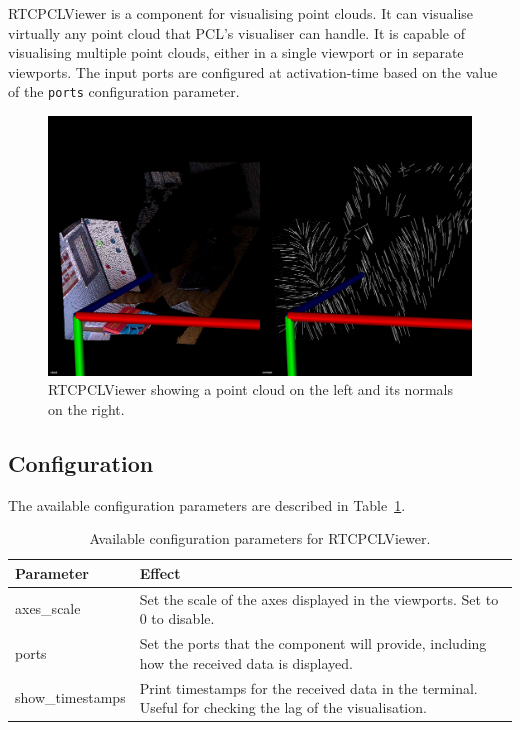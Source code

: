 \documentclass[a4paper,10pt]{article}
\begin{document}
RTCPCLViewer is a component for visualising point clouds. It can visualise
virtually any point cloud that PCL's visualiser can handle. It is capable of
visualising multiple point clouds, either in a single viewport or in separate
viewports. The input ports are configured at activation-time based on the value
of the \verb|ports| configuration parameter.

\begin{figure}
  \centering
  \includegraphics[width=\columnwidth,keepaspectratio]{rtcpclviewer_normals_large}
  \caption{RTCPCLViewer showing a point cloud on the left and its normals on the right.}
  \label{fig:rtcpclviewer}
\end{figure}

\subsection{Configuration}
\label{sec1:viewer_configuration}

The available configuration parameters are described in
Table~\ref{tab:viewer_config_params}.

\begin{table}[t]
  \centering
  \begin{tabularx}{\columnwidth}{lX}
    \toprule
    Parameter & Effect \\
    \midrule
    axes\_scale & Set the scale of the axes displayed in the viewports. Set to 0 to disable. \\
    ports & Set the ports that the component will provide, including how the received data is displayed. \\
    show\_timestamps & Print timestamps for the received data in the terminal. Useful for checking the lag of the visualisation. \\
    \bottomrule
  \end{tabularx}
  \caption{Available configuration parameters for RTCPCLViewer.}
  \label{tab:viewer_config_params}
\end{table}
\end{document}
